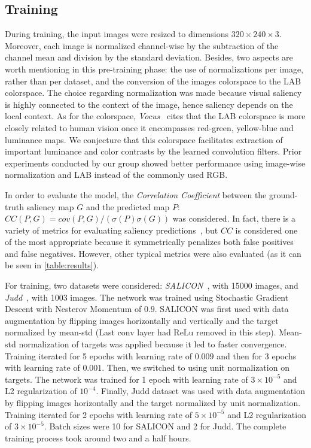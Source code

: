 \documentclass[12pt]{article}
\begin{document}
\subsection{Training}
During training, the input images were resized to dimensions $320\times240\times3$.
Moreover, each image is normalized channel-wise by the subtraction of the channel mean and
division by the standard deviation. Besides, two aspects are worth mentioning in this pre-training phase: the use of normalizations per image, rather than per dataset, and the conversion of the images colorspace to the LAB colorspace. The choice regarding normalization was made because visual saliency is highly connected to the context of the image, hence saliency depends on the local context.
As for the colorspace, \emph{Vocus}~\cite{frintrop_2005} cites that the LAB colorspace is more
closely related to human vision once it encompasses red-green, yellow-blue and
luminance maps. We conjecture that this colorspace facilitates extraction of
important luminance and color contrasts by the learned convolution filters.
Prior experiments conducted by our group showed better performance using image-wise
normalization and LAB instead of the commonly used RGB\@.

In order to evaluate the model, the \emph{Correlation Coefficient} between the ground-truth saliency map $G$ and
the predicted map $P$: $CC(P, G) = cov(P, G)/(\sigma(P)\sigma(G))$ was considered.
In fact, there is a variety of metrics for evaluating saliency
predictions~\cite{judd_2016}, but $CC$ is considered one of the most appropriate
because it symmetrically penalizes both false positives and false negatives. However, other typical metrics were also evaluated (as it can be seen in \ref{table:results}).

For training, two datasets were considered:
\emph{SALICON}~\cite{jiang_2015}, with 15000 images, and
\emph{Judd}~\cite{judd}, with 1003 images.
The network was trained using Stochastic Gradient Descent with Nesterov
Momentum of $0.9$. SALICON was first used with data augmentation by flipping images
horizontally and vertically and the target normalized by mean-std
(Last conv layer had ReLu removed in this step).
Mean-std normalization of targets was applied because it led to faster convergence.
Training iterated for 5 epochs with learning rate of $0.009$
and then for 3 epochs with learning rate of $0.001$. Then, we switched to using unit normalization on targets.
The network was trained for 1 epoch with learning rate of
$3\times10^{-5}$ and L2 regularization of $10^{-4}$. Finally, Judd dataset was used with data augmentation by flipping images horizontally and the target normalized by unit normalization.
Training iterated for 2 epochs with learning rate of
$5\times10^{-5}$ and L2 regularization of $3\times10^{-5}$. Batch sizes were 10 for SALICON and 2 for Judd. The complete training process took around two and a half hours.
\end{document}
